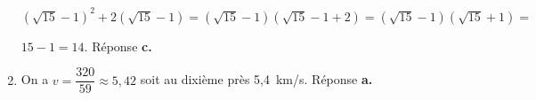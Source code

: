 \begin{enumerate}
$\left(\sqrt{15}  - 1\right)^2 + 2\left(\sqrt{15}  - 1\right) =  \left(\sqrt{15}  - 1\right)\left(\sqrt{15}  - 1 + 2\right) = \left(\sqrt{15}  - 1\right)\left(\sqrt{15}  + 1\right) =$

$ 15 - 1 = 14$. Réponse \textbf{c.}
\item %


%
%
On a $v = \dfrac{320}{59} \approx 5,42$ soit au dixième près 5,4~km/s. Réponse \textbf{a.}
\end{enumerate}

\vspace{0,5cm}


